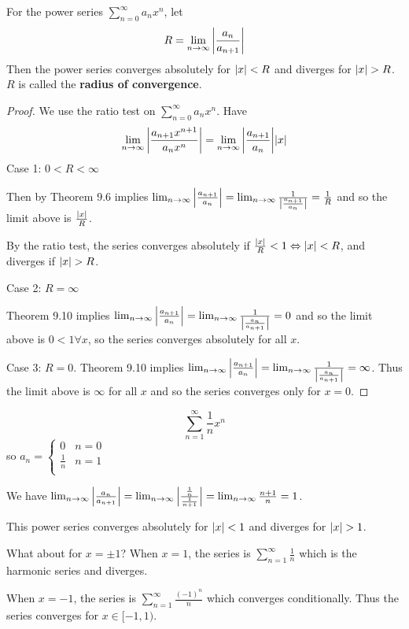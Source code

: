 \documentclass{article}
\begin{document}
\begin{theorem}
  For the power series $\sum_{n=0}^\infty a_nx^n$, let
  \[
    R = \lim_{n\to\infty} \abs{\frac{a_n}{a_{n+1}}}
  \]
  Then the power series converges absolutely for $\abs{x} < R$ and diverges for $\abs{x} > R$. $R$ is called the \textbf{radius of convergence}.
\end{theorem}
\begin{proof}
  We use the ratio test on $\sum_{n=0}^\infty a_nx^n$. Have \[
    \lim_{n\to\infty} \abs{\frac{a_{n+1}x^{n+1}}{a_nx^n}} = \lim_{n\to\infty}\abs{\frac{a_{n+1}}{a_n}}\abs{x}
  \]
  Case 1: $0 < R < \infty$

  Then by Theorem 9.6 implies $\lim_{n\to\infty} \abs{\frac{a_{n+1}}{a_n}} = \lim_{n\to\infty} \frac{1}{\abs{\frac{a_{n+1}}{a_n}}} = \frac{1}{R}$ and so the limit above is $\frac{\abs{x}}{R}$.

  By the ratio test, the series converges absolutely if $\frac{|x|}{R} < 1 \Leftrightarrow \abs{x} < R$, and diverges if $\abs{x} > R$.

  Case 2: $R = \infty$

  Theorem 9.10 implies $\lim_{n\to\infty} \abs{\frac{a_{n+1}}{a_n}} = \lim_{n\to\infty} \frac{1}{\abs{\frac{a_n}{a_{n+1}}}} = 0$ and so the limit above is $0 < 1 \forall x$, so the series converges absolutely for all $x$.

  Case 3: $R = 0$. Theorem 9.10 implies $\lim_{n\to\infty} \abs{\frac{a_{n+1}}{a_n}} = \lim_{n\to\infty} \frac{1}{\abs{\frac{a_n}{a_{n+1}}}} = \infty$. Thus the limit above is $\infty$ for all $x$ and so the series converges only for $x=0$.
\end{proof}
\begin{example}
  \[
    \sum_{n=1}^\infty \frac{1}{n}x^n
  \] so $a_n =
  \begin{cases}
    0 & n = 0\\
    \frac{1}{n} & n=1\\
  \end{cases}$

  We have $\lim_{n\to\infty} \abs{\frac{a_n}{a_{n+1}}} = \lim_{n\to\infty} \abs{\frac{\frac{1}{n}}{\frac{1}{n+1}}} = \lim_{n\to\infty} \frac{n+1}{n} = 1$.

  This power series converges absolutely for $\abs{x} < 1$ and diverges for $\abs{x} > 1$.

  What about for $x = \pm 1$? When $x=1$, the series is $\sum_{n=1}^\infty \frac{1}{n}$ which is the harmonic series and diverges.

  When $x=-1$, the series is $\sum_{n=1}^\infty \frac{(-1)^n}{n}$ which converges conditionally. Thus the series converges for $x \in [-1, 1)$.
\end{example}
\end{document}

